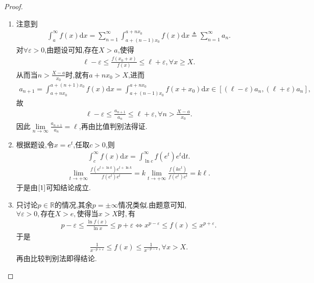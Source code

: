 \documentclass[../../main.tex]{subfiles}
\begin{document}
\begin{proof}
\begin{enumerate}[(1)]
\item 注意到
\begin{align*}
\int_a^{\infty}{f\left( x \right) \mathrm{d}x}=\sum_{n=1}^{\infty}{\int_{a+\left( n-1 \right) x_0}^{a+nx_0}{f\left( x \right) \mathrm{d}x}}\triangleq \sum_{n=1}^{\infty}{a_n}.
\end{align*}
对$\forall \varepsilon >0$,由题设可知,存在$X>a$,使得
\begin{align*}
\ell -\varepsilon \leqslant \frac{f\left( x_0+x \right)}{f\left( x \right)}\leqslant \ell +\varepsilon ,\forall x\geqslant X.
\end{align*}
从而当$n>\frac{X-a}{x_0}$时,就有$a+nx_0>X$,进而
\begin{align*}
a_{n+1}=\int_{a+nx_0}^{a+\left( n+1 \right) x_0}{f\left( x \right) \mathrm{d}x}=\int_{a+\left( n-1 \right) x_0}^{a+nx_0}{f\left( x+x_0 \right) \mathrm{d}x}\in \left[ \left( \ell -\varepsilon \right) a_n,\left( \ell +\varepsilon \right) a_n \right] ,
\end{align*}
故
\begin{align*}
\ell -\varepsilon \leqslant \frac{a_{n+1}}{a_n}\leqslant \ell +\varepsilon ,\forall n>\frac{X-a}{x_0}.
\end{align*}
因此$\underset{n\rightarrow \infty}{\lim}\frac{a_{n+1}}{a_n}=\ell$,再由比值判别法得证.

\item 根据题设,令$x=e^t$,任取$c>0$,则
\begin{align*}
\int_c^{\infty}{f\left( x \right) \mathrm{d}x}=\int_{\ln c}^{\infty}{f\left( e^t \right) e^t\mathrm{d}t}.
\end{align*}
\begin{align*}
\underset{t\rightarrow +\infty}{\lim}\frac{f\left( e^{t+\ln k} \right) e^{t+\ln k}}{f\left( e^t \right) e^t}=k\underset{t\rightarrow +\infty}{\lim}\frac{f\left( ke^t \right)}{f\left( e^t \right) e^t}=k\ell .
\end{align*}
于是由$\eqref{1}$可知结论成立.

\item 只讨论$p\in \mathbb{R}$的情况,其余$p=\pm \infty$情况类似.由题意可知,$\forall \varepsilon >0,\text{存在}X>e,\text{使得当}x>X\text{时},\text{有}$
\begin{align*}
p-\varepsilon \leqslant \frac{\ln f\left( x \right)}{\ln x}\leqslant p+\varepsilon \Longleftrightarrow x^{p-\varepsilon}\leqslant f\left( x \right) \leqslant x^{p+\varepsilon}.
\end{align*}
于是
\begin{align*}
\frac{1}{x^{-p+\varepsilon}}\leqslant f\left( x \right) \leqslant \frac{1}{x^{-p-\varepsilon}},\forall x>X.
\end{align*}
再由比较判别法即得结论.
\end{enumerate}

\end{proof}
\end{document}
